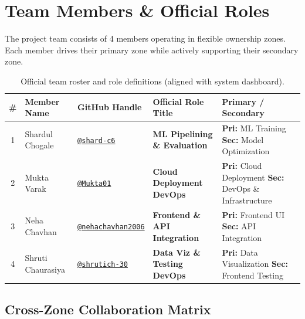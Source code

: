 \documentclass[11pt, a4paper]{article}
\begin{document}
\section{Team Members \& Official Roles}
\label{sec:team}

The project team consists of 4 members operating in flexible ownership zones. Each member drives their primary zone while actively supporting their secondary zone.

\begin{table}[h!]
\centering
\small
\renewcommand{\arraystretch}{1.4}
\begin{tabularx}{\textwidth}{|c|p{}|p{}|X|X|}
\hline
\rowcolor{primary!10}
\textbf{\#} & \textbf{Member Name} & \textbf{GitHub Handle} & \textbf{Official Role Title} & \textbf{Primary / Secondary} \\
\hline
1 & Shardul Chogale & \href{https://github.com/shard-c6}{\texttt{@shard-c6}} & \textbf{ML Pipelining \& Evaluation} & \textbf{Pri:} ML Training \newline \textbf{Sec:} Model Optimization \\
\hline
2 & Mukta Varak & \href{https://github.com/Mukta01}{\texttt{@Mukta01}} & \textbf{Cloud Deployment DevOps} & \textbf{Pri:} Cloud Deployment \newline \textbf{Sec:} DevOps \& Infrastructure \\
\hline
3 & Neha Chavhan & \href{https://github.com/nehachavhan2006}{\texttt{@nehachavhan2006}} & \textbf{Frontend \& API Integration} & \textbf{Pri:} Frontend UI \newline \textbf{Sec:} API Integration \\
\hline
4 & Shruti Chaurasiya & \href{https://github.com/shrutich-30}{\texttt{@shrutich-30}} & \textbf{Data Viz \& Testing DevOps} & \textbf{Pri:} Data Visualization \newline \textbf{Sec:} Frontend Testing \\
\hline
\end{tabularx}
\caption{Official team roster and role definitions (aligned with system dashboard).}
\end{table}

\subsection{Cross-Zone Collaboration Matrix}
\end{document}
